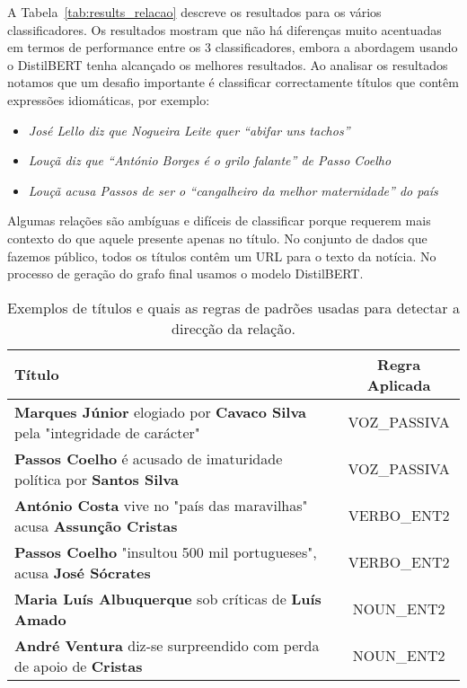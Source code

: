 \documentclass[a4paper, twocolumn, 11pt, twoside]{article}
\begin{document}
A Tabela~\ref{tab:results_relacao} descreve os resultados para os vários classificadores. Os resultados mostram que não há diferenças muito acentuadas em termos de performance entre os 3 classificadores, embora a abordagem usando o DistilBERT tenha alcançado os melhores resultados. Ao analisar os resultados notamos que um desafio importante é classificar correctamente títulos que contêm expressões idiomáticas, por exemplo:

\begin{itemize}
\item{\textit{José Lello diz que Nogueira Leite quer “abifar uns tachos”}}
\item{\textit{Louçã diz que “António Borges é o grilo falante” de Passo Coelho}}
\item{\textit{Louçã acusa Passos de ser o “cangalheiro da melhor maternidade” do país}}
\end{itemize}

Algumas relações são ambíguas e difíceis de classificar porque requerem mais contexto do que aquele presente apenas no título. No conjunto de dados que fazemos público, todos os títulos contêm um URL para o texto da notícia. No processo de geração do grafo final usamos o modelo DistilBERT.

\begin{table*}
  \centering
  \begin{tabular}{lc}
      {\bf Título} & {\bf Regra Aplicada} \\
      \hline
	  \textbf{Marques Júnior} elogiado por \textbf{Cavaco Silva} pela "integridade de carácter" & VOZ\_PASSIVA \\
	  \textbf{Passos Coelho} é acusado de imaturidade política por \textbf{Santos Silva}  		& VOZ\_PASSIVA \\
	  \textbf{António Costa} vive no "país das maravilhas" acusa \textbf{Assunção Cristas}      & VERBO\_ENT2 \\
	  \textbf{Passos Coelho} "insultou 500 mil portugueses", acusa \textbf{José Sócrates}		& VERBO\_ENT2 \\ 
	  \textbf{Maria Luís Albuquerque} sob críticas de \textbf{Luís Amado}						& NOUN\_ENT2 \\
	  \textbf{André Ventura} diz-se surpreendido com perda de apoio de \textbf{Cristas}			& NOUN\_ENT2 \\

	  \hline
  \end{tabular}
  \caption{Exemplos de títulos e quais as regras de padrões usadas para detectar a direcção da relação.}
  \label{tab:examples_patterns_direction}
\end{table*}
\end{document}
